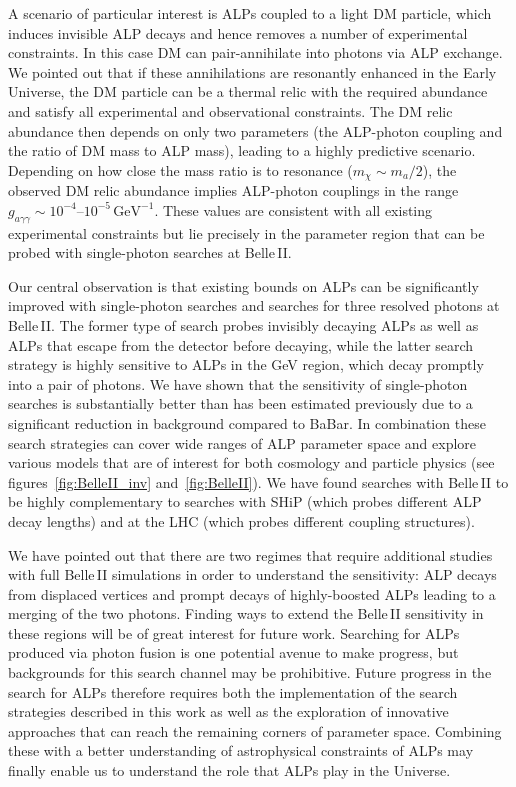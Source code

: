 \documentclass[11pt,a4paper]{article}
\newcommand{\ga}{g_{a\gamma\gamma}}
\def \belletwo {Belle\,II\xspace}
\def \babar {BaBar\xspace}
\begin{document}
A scenario of particular interest is ALPs coupled to a light DM particle, which induces invisible ALP decays and hence removes a number of experimental constraints. In this case DM can pair-annihilate into photons via ALP exchange. We pointed out that if these annihilations are resonantly enhanced in the Early Universe, the DM particle can be a thermal relic with the required abundance and satisfy all experimental and observational constraints. The DM relic abundance then depends on only two parameters (the ALP-photon coupling and the ratio of DM mass to ALP mass), leading to a highly predictive scenario. Depending on how close the mass ratio is to resonance ($m_\chi \sim m_a / 2$), the observed DM relic abundance implies ALP-photon couplings in the range $\ga \sim 10^{-4}\text{--}10^{-5}\,\mathrm{GeV}^{-1}$. These values are consistent with all existing experimental constraints but lie precisely in the parameter region that can be probed with single-photon searches at \belletwo.

Our central observation is that existing bounds on ALPs can be significantly improved with single-photon searches and searches for three resolved photons at \belletwo. The former type of search probes invisibly decaying ALPs as well as ALPs that escape from the detector before decaying, while the latter search strategy is highly sensitive to ALPs in the GeV region, which decay promptly into a pair of photons. We have shown that the sensitivity of single-photon searches is substantially better than has been estimated previously due to a significant reduction in background compared to \babar. In combination these search strategies can cover wide ranges of ALP parameter space and explore various models that are of interest for both cosmology and particle physics (see figures~\ref{fig:BelleII_inv} and~\ref{fig:BelleII}). We have found searches with \belletwo to be highly complementary to searches with SHiP (which probes different ALP decay lengths) and at the LHC (which probes different coupling structures).

We have pointed out that there are two regimes that require additional studies with full \belletwo simulations in order to understand the sensitivity: ALP decays from displaced vertices and prompt decays of highly-boosted ALPs leading to a merging of the two photons. Finding ways to extend the \belletwo sensitivity in these regions will be of great interest for future work. Searching for ALPs produced via photon fusion is one potential avenue to make progress, but backgrounds for this search channel may be prohibitive. Future progress in the search for ALPs therefore requires both the implementation of the search strategies described in this work as well as the exploration of innovative approaches that can reach the remaining corners of parameter space. Combining these with a better understanding of astrophysical constraints of ALPs may finally enable us to understand the role that ALPs play in the Universe.
\end{document}
